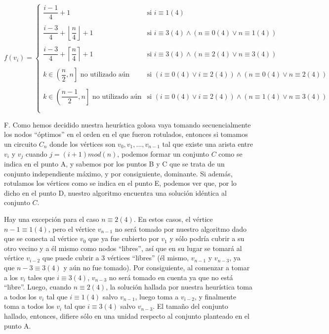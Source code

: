 \begin{equation*}
f(v_i) = \begin{cases}
\dfrac{i-1}{4}+1 & \text{si } i \equiv 1 (4)\\\\
\dfrac{i-3}{4}+\left\lfloor \dfrac{n}{4} \right\rfloor + 1 & \text{si } i \equiv 3 (4) \wedge (n \equiv 0 (4) \vee n \equiv 1 (4))\\\\
\dfrac{i-3}{4}+\left\lceil \dfrac{n}{4} \right\rceil + 1 & \text{si } i \equiv 3 (4) \wedge (n \equiv 2 (4) \vee n \equiv 3 (4))\\\\
k \in \left(\dfrac{n}{2},n\right] \text{ no utilizado aún} & \text{si } (i \equiv 0 (4) \vee i \equiv 2 (4)) \wedge (n \equiv 0 (4) \vee n \equiv 2 (4))\\\\
k \in \left(\dfrac{n-1}{2},n\right] \text{ no utilizado aún} & \text{si } (i \equiv 0 (4) \vee i \equiv 2 (4)) \wedge (n \equiv 1 (4) \vee n \equiv 3 (4))\\\\
\end{cases}
\end{equation*}

F. Como hemos decidido nuestra heurística golosa vaya tomando secuencialmente los nodos ``óptimos'' en el orden en el que fueron rotulados, entonces si tomamos un circuito $C_n$ donde los vértices son $v_0,v_1,...,v_{n-1}$ tal que existe una arista entre $v_i$ y $v_j$ cuando $j = (i+1) mod (n)$, podemos formar un conjunto $C$ como se indica en el punto A, y sabemos por los puntos B y C que se trata de un conjunto independiente máximo, y por consiguiente, dominante.  Si además, rotulamos los vértices como se indica en el punto E, podemos ver que, por lo dicho en el punto D, nuestro algoritmo encuentra una solución idéntica al conjunto $C$. 

Hay una excepción para el caso $n \equiv 2 (4)$. En estos casos, el vértice $n-1 \equiv 1 (4)$, pero el vértice $v_{n-1}$ no será tomado por nuestro algoritmo dado que se conecta al vértice $v_0$ que ya fue cubierto por $v_1$ y sólo podría cubrir a su otro vecino y a él mismo como nodos ``libres'', así que en su lugar se tomará al vértice $v_{i-2}$ que puede cubrir a 3 vértices ``libres'' (él mismo, $v_{n-1}$ y $v_{n-3}$, ya que $n-3 \equiv 3 (4)$ y aún no fue tomado). Por consiguiente, al comenzar a tomar a los $v_i$ tales que $i \equiv 3 (4)$, $v_{n-3}$ no será tomado en cuenta ya que no está ``libre''.  Luego, cuando $n \equiv 2 (4)$, la solución hallada por nuestra heurística toma a todos los $v_i$ tal que $i \equiv 1 (4)$ salvo $v_{n-1}$, luego toma a $v_{i-2}$, y finalmente toma a todos los $v_i$ tal que $i \equiv 3 (4)$ salvo $v_{n-3}$.  El tamaño del conjunto hallado, entonces, difiere sólo en una unidad respecto al conjunto planteado en el punto A.

